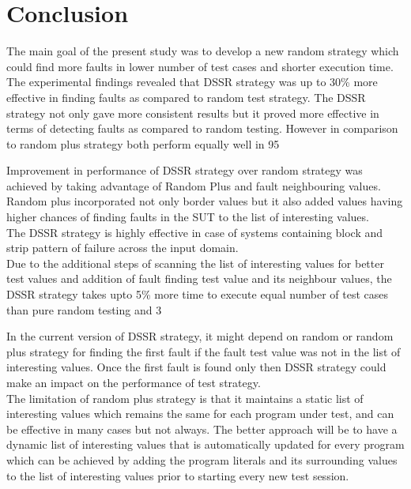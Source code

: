 \section{Conclusion}

The main goal of the present study was to develop a new random strategy which could find more faults in lower number of test cases and shorter execution time. The experimental findings revealed that DSSR strategy was up to 30\% more effective in finding faults as compared to random test strategy. The DSSR strategy not only gave more consistent results but it proved more effective in terms of detecting faults as compared to random testing. However in comparison to random plus strategy both perform equally well in 95%

Improvement in performance of DSSR strategy over random strategy was achieved by taking advantage of Random Plus and fault neighbouring values. Random plus incorporated not only border values but it also added values having higher chances of finding faults in the SUT to the list of interesting values.\\

The DSSR strategy is highly effective in case of systems containing block and strip pattern of failure across the input domain.\\

Due to the additional steps of scanning the list of interesting values for better test values and addition of fault finding test value and its neighbour values, the DSSR strategy takes upto 5\% more time to execute equal number of test cases than pure random testing and 3%

In the current version of DSSR strategy, it might depend on random or random plus strategy for finding the first fault if the fault test value was not in the list of interesting values. Once the first fault is found only then DSSR strategy could make an impact on the performance of test strategy.\\

The limitation of random plus strategy is that it maintains a static list of interesting values which remains the same for each program under test, and can be effective in many cases but not always. The better approach will be to have a dynamic list of interesting values that is automatically updated for every program which can be achieved by adding the program literals and its surrounding values to the list of interesting values prior to starting every new test session.




